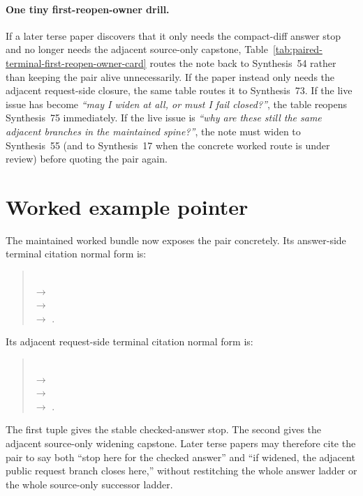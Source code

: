 \documentclass[11pt]{article}
\begin{document}
\paragraph{One tiny first-reopen-owner drill.}
If a later terse paper discovers that it only needs the compact-diff answer stop and no longer needs the adjacent source-only capstone, Table~\ref{tab:paired-terminal-first-reopen-owner-card} routes the note back to Synthesis~54 rather than keeping the pair alive unnecessarily. If the paper instead only needs the adjacent request-side closure, the same table routes it to Synthesis~73. If the live issue has become \emph{``may I widen at all, or must I fail closed?''}, the table reopens Synthesis~75 immediately. If the live issue is \emph{``why are these still the same adjacent branches in the maintained spine?''}, the note must widen to Synthesis~55 (and to Synthesis~17 when the concrete worked route is under review) before quoting the pair again.
\section{Worked example pointer}
The maintained worked bundle now exposes the pair concretely.
Its answer-side terminal citation normal form is:
\begin{quote}\small
{}\\
$\to$ \\
$\to$ \\
$\to$ .
\end{quote}
Its adjacent request-side terminal citation normal form is:
\begin{quote}\small
{}\\
$\to$ \\
$\to$ \\
$\to$ .
\end{quote}
The first tuple gives the stable checked-answer stop.
The second gives the adjacent source-only widening capstone.
Later terse papers may therefore cite the pair to say both ``stop here for the checked answer'' and ``if widened, the adjacent public request branch closes here,'' without restitching the whole answer ladder or the whole source-only successor ladder.
\end{document}
